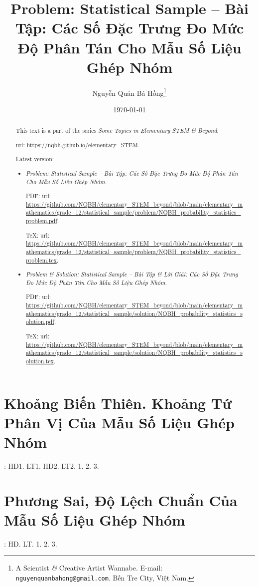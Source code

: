 \documentclass{article}
\title{Problem: Statistical Sample -- Bài Tập: Các Số Đặc Trưng Đo Mức Độ Phân Tán Cho Mẫu Số Liệu Ghép Nhóm}
\author{Nguyễn Quản Bá Hồng\footnote{A Scientist {\it\&} Creative Artist Wannabe. E-mail: {\tt nguyenquanbahong@gmail.com}. Bến Tre City, Việt Nam.}}
\date{\today}
\begin{document}
\maketitle
\begin{abstract}
	This text is a part of the series {\it Some Topics in Elementary STEM \& Beyond}:
	
	{\sc url}: \url{https://nqbh.github.io/elementary_STEM}.
	
	Latest version:
	\begin{itemize}
		\item {\it Problem: Statistical Sample -- Bài Tập: Các Số Đặc Trưng Đo Mức Độ Phân Tán Cho Mẫu Số Liệu Ghép Nhóm}.
		
		PDF: {\sc url}: \url{https://github.com/NQBH/elementary_STEM_beyond/blob/main/elementary_mathematics/grade_12/statistical_sample/problem/NQBH_probability_statistics_problem.pdf}.
		
		\TeX: {\sc url}: \url{https://github.com/NQBH/elementary_STEM_beyond/blob/main/elementary_mathematics/grade_12/statistical_sample/problem/NQBH_probability_statistics_problem.tex}.
		\item {\it Problem \& Solution: Statistical Sample -- Bài Tập \& Lời Giải: Các Số Đặc Trưng Đo Mức Độ Phân Tán Cho Mẫu Số Liệu Ghép Nhóm}.
		
		PDF: {\sc url}: \url{https://github.com/NQBH/elementary_STEM_beyond/blob/main/elementary_mathematics/grade_12/statistical_sample/solution/NQBH_probability_statistics_solution.pdf}.
		
		\TeX: {\sc url}: \url{https://github.com/NQBH/elementary_STEM_beyond/blob/main/elementary_mathematics/grade_12/statistical_sample/solution/NQBH_probability_statistics_solution.tex}.
	\end{itemize}
\end{abstract}
\tableofcontents


\section{Khoảng Biến Thiên. Khoảng Tứ Phân Vị Của Mẫu Số Liệu Ghép Nhóm}
\cite[Chap. III, \S1, pp. 84--88]{SGK_Toan_12_Canh_Dieu_tap_1}: HD1. LT1. HD2. LT2. 1. 2. 3.


\section{Phương Sai, Độ Lệch Chuẩn Của Mẫu Số Liệu Ghép Nhóm}
\cite[Chap. III, \S2, pp. 84--88]{SGK_Toan_12_Canh_Dieu_tap_1}: HD. LT. 1. 2. 3.
\end{document}
